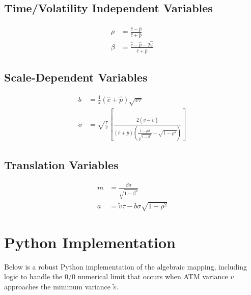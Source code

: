 \documentclass[12pt]{article}
\begin{document}
\subsection{Time/Volatility Independent Variables}
\begin{align}
    \rho &= \frac{\hat{c} - \hat{p}}{\hat{c} + \hat{p}} \\
    \beta &= \frac{\hat{c} - \hat{p} - 2\hat{\psi}}{\hat{c} + \hat{p}}
\end{align}

\subsection{Scale-Dependent Variables}
\begin{align}
    b &= \frac{1}{2} (\hat{c} + \hat{p}) \sqrt{v \tau} \\
    \sigma &= \sqrt{\frac{\tau}{v}} \left[ \frac{2(v - \tilde{v})}{(\hat{c} + \hat{p}) \left( \frac{1 - \rho \beta}{\sqrt{1-\beta^2}} - \sqrt{1-\rho^2} \right)} \right]
\end{align}

\subsection{Translation Variables}
\begin{align}
    m &= \frac{\beta \sigma}{\sqrt{1-\beta^2}} \\
    a &= \tilde{v}\tau - b\sigma\sqrt{1-\rho^2}
\end{align}

\section{Python Implementation}
Below is a robust Python implementation of the algebraic mapping, including logic to handle the $0/0$ numerical limit that occurs when ATM variance $v$ approaches the minimum variance $\tilde{v}$.
\end{document}
